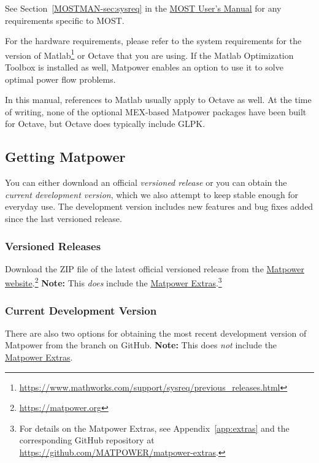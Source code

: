 \documentclass[12pt]{article}
\newcommand{\matlab}[0]{{\sc Matlab}}
\newcommand{\matpower}[0]{{\sc Matpower}}
\newcommand{\matpowerurl}[0]{https://matpower.org}
\newcommand{\matpowerextrasgithuburl}[0]{https://github.com/MATPOWER/matpower-extras}
\newcommand{\matpowerextraslink}[0]{\href{\matpowerextrasgithuburl}{\matpower{} Extras}}
\newcommand{\most}[0]{{MOST}}
\newcommand{\mostver}[0]{1.1}
\newcommand{\glpk}[0]{{GLPK}}
\newcommand{\ot}[0]{{Optimization Toolbox}}
\newcommand{\code}[1]{{\relsize{-0.5}{\tt{{#1}}}}}  %
\newcommand{\mostmanurl}[0]{https://matpower.org/docs/MOST-manual-\mostver.pdf}
\newcommand{\mostman}[0]{\href{\mostmanurl}{\most{} User's Manual}}
\numberwithin{equation}{section}
\numberwithin{table}{section}
\numberwithin{figure}{section}
\begin{document}
See Section~\ref{MOSTMAN-sec:sysreq} in the \mostman{} for any requirements specific to \most{}.

For the hardware requirements, please refer to the system requirements for the version of \matlab{}\footnote{\url{https://www.mathworks.com/support/sysreq/previous_releases.html}} or Octave that you are using. If the \matlab{} \ot{} is installed as well, \matpower{} enables an option to use it to solve optimal power flow problems.

In this manual, references to \matlab{} usually apply to Octave as well. At the time of writing, none of the optional MEX-based \matpower{} packages have been built for Octave, but Octave does typically include \glpk{}.

\pagebreak
\subsection{Getting \matpower{}}
\label{sec:gettingmatpower}

You can either download an official \emph{versioned release} or you can obtain the \emph{current development version}, which we also attempt to keep stable enough for everyday use. The development version includes new features and bug fixes added since the last versioned release.

\subsubsection{Versioned Releases}

Download the ZIP file of the latest official versioned release from the \href{\matpowerurl}{\matpower{} website}.\footnote{\url{\matpowerurl}}
{\bf Note:} This \emph{does} include the \matpowerextraslink{}.\footnote{For details on the \matpower{} Extras, see Appendix~\ref{app:extras} and the corresponding GitHub repository at \url{\matpowerextrasgithuburl}.}

\subsubsection{Current Development Version}

There are also two options for obtaining the most recent development version
of \matpower{} from the \code{master} branch on GitHub.
{\bf Note:} This does \emph{not} include the \matpowerextraslink{}.
\end{document}
